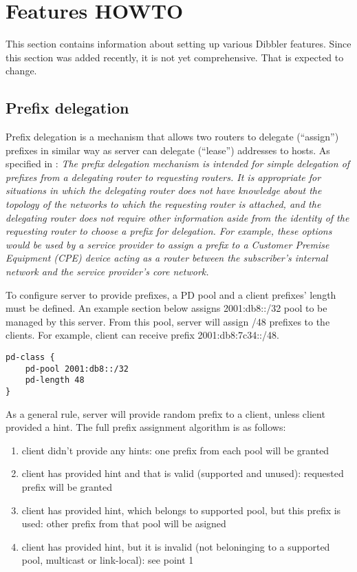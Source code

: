 \newpage
\section{Features HOWTO}
This section contains information about setting up various Dibbler
features. Since this section was added recently, it is not yet
comprehensive. That is expected to change.

\subsection{Prefix delegation}
\label{feature-prefix}
Prefix delegation is a mechanism that allows two routers to delegate
(``assign'') prefixes in similar way as server can delegate
(``lease'') addresses to hosts. As specified in \cite{rfc3633}: \emph{
  The prefix delegation mechanism is intended for simple delegation of
  prefixes from a delegating router to requesting routers.  It is
  appropriate for situations in which the delegating router does not
  have knowledge about the topology of the networks to which the
  requesting router is attached, and the delegating router does not
  require other information aside from the identity of the requesting
  router to choose a prefix for delegation.  For example, these
  options would be used by a service provider to assign a prefix to a
  Customer Premise Equipment (CPE) device acting as a router between
  the subscriber's internal network and the service provider's core
  network.}

To configure server to provide prefixes, a PD pool and a client
prefixes' length must be defined. An example section below assigns
2001:db8::/32 pool to be managed by this server. From this pool,
server will assign /48 prefixes to the clients. For example, client
can receive prefix 2001:db8:7c34::/48.

\begin{lstlisting}
pd-class {
    pd-pool 2001:db8::/32
    pd-length 48
}
\end{lstlisting}

As a general rule, server will provide random prefix to a client,
unless client provided a hint. The full prefix assignment algorithm is
as follows:

\begin{enumerate}
\item client didn't provide any hints: one prefix from each pool will
  be granted
\item client has provided hint and that is valid (supported and
  unused): requested prefix will be granted
\item client has provided hint, which belongs to supported pool, but
  this prefix is used: other prefix from that pool will be asigned
\item client has provided hint, but it is invalid (not beloninging to
  a supported pool, multicast or link-local): see point 1
\end{enumerate}

